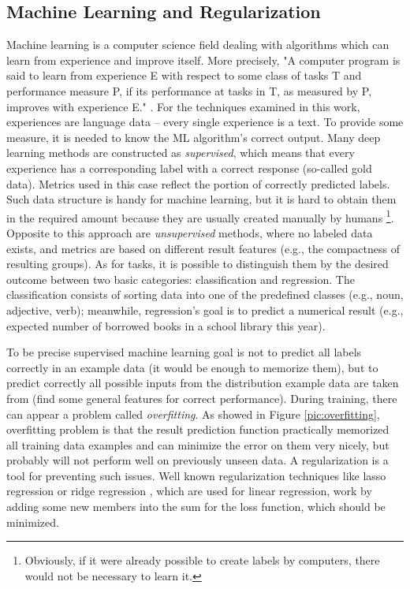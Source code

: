 \subsection{Machine Learning and Regularization}
\label{sub:ml}
Machine learning is a computer science field dealing with algorithms which can learn from experience and improve itself. More precisely, "A computer program is said to learn from experience E with respect to some class of tasks T and performance measure P, if its performance at tasks in T, as measured by P, improves with experience E." \citep{Mitchell1997}. For the techniques examined in this work, experiences are language data -- every single experience is a text. To provide some measure, it is needed to know the ML algorithm's correct output. Many deep learning methods are constructed as \textit{supervised}, which means that every experience has a corresponding label with a correct response (so-called gold data). Metrics used in this case reflect the portion of correctly predicted labels. \citep{Russell1995} Such data structure is handy for machine learning, but it is hard to obtain them in the required amount because they are usually created manually by humans \footnote{Obviously, if it were already possible to create labels by computers, there would not be necessary to learn it.}. Opposite to this approach are \textit{unsupervised} methods, where no labeled data exists, and metrics are based on different result features (e.g., the compactness of resulting groups). As for tasks, it is possible to distinguish them by the desired outcome between two basic categories: classification and regression. The classification consists of sorting data into one of the predefined classes (e.g., noun, adjective, verb); meanwhile, regression's goal is to predict a numerical result (e.g., expected number of borrowed books in a school library this year).
\par
To be precise supervised machine learning goal is not to predict all labels correctly in an example data (it would be enough to memorize them), but to predict correctly all possible inputs from the distribution example data are taken from (find some general features for correct performance). During training, there can appear a problem called \textit{overfitting}. As showed in Figure \ref{pic:overfitting}, overfitting problem is that the result prediction function practically memorized all training data examples and can minimize the error on them very nicely, but probably will not perform well on previously unseen data. A regularization is a tool for preventing such issues. Well known regularization techniques like lasso regression \citep{Tibshirani1996} or ridge regression \citep{Hoerl1970}, which are used for linear regression, work by adding some new members into the sum for the loss function, which should be minimized.
